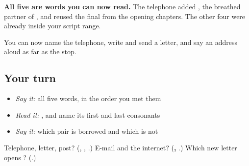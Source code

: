 \begin{grammarlens}[title={What you've built}]
\textbf{All five are words you can now read.} The telephone added \textbf{}, the breathed partner of \textbf{}, and reused the final \textbf{} from the opening chapters. The other four were already inside your script range.

You can now name the telephone, write and send a letter, and say an address aloud as far as the stop.
\end{grammarlens}

\subsection*{Your turn}
\begin{itemize}
\raggedright
  \item \emph{Say it:} all five words, in the order you met them
  \item \emph{Read it:} \textbf{}, and name its first and last consonants
  \item \emph{Say it:} which pair is borrowed and which is not
\end{itemize}

\begin{tcolorbox}[breakable,colback=teal!4,colframe=teal!35!black,title={Before you move on}]
Telephone, letter, post? (\textbf{}, \textbf{}, \textbf{}.) E-mail and the internet? (\textbf{, }.) Which new letter opens \textbf{}? (\textbf{}.)
\end{tcolorbox}
